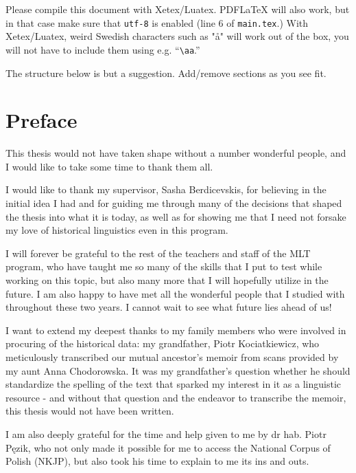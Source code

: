 \documentclass[11pt, a4paper]{article}
\begin{document}
Please compile this document with Xetex/Luatex. PDFLaTeX will also work, but in that case make sure that \texttt{utf-8} is enabled (line 6 of \texttt{main.tex}.) With Xetex/Luatex, weird Swedish characters such as "å" will work out of the box, you will not have to include them using e.g. ``\texttt{\textbackslash aa}.''

The structure below is but a suggestion. Add/remove sections as you see fit.

\thispagestyle{empty}

\newpage
\section*{Preface}

This thesis would not have taken shape without a number wonderful people, and I would like to take some time to thank them all.  

I would like to thank my supervisor, Sasha Berdicevskis, for believing in the initial idea I had and for guiding me through many of the decisions that shaped the thesis into what it is today, as well as for showing me that I need not forsake my love of historical linguistics even in this program.

I will forever be grateful to the rest of the teachers and staff of the MLT program, who have taught me so many of the skills that I put to test while working on this topic, but also many more that I will hopefully utilize in the future. I am also happy to have met all the wonderful people that I studied with throughout these two years. I cannot wait to see what future lies ahead of us!

I want to extend my deepest thanks to my family members who were involved in procuring of the historical data: my grandfather, Piotr Kociatkiewicz, who meticulously transcribed our mutual ancestor's memoir from scans provided by my aunt Anna Chodorowska. It was my grandfather's question whether he should standardize the spelling of the text that sparked my interest in it as a linguistic resource - and without that question and the endeavor to transcribe the memoir, this thesis would not have been written.

I am also deeply grateful for the time and help given to me by dr hab. Piotr Pęzik, who not only made it possible for me to access the National Corpus of Polish (NKJP), but also took his time to explain to me its ins and outs.
\end{document}
